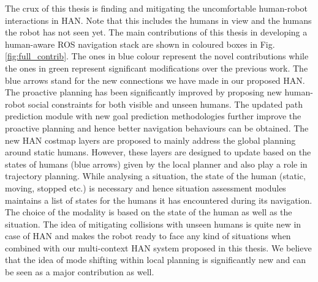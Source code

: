 The crux of this thesis is finding and mitigating the uncomfortable human-robot interactions in HAN. Note that this includes the humans in view and the humans the robot has not seen yet. The main contributions of this thesis in developing a human-aware ROS navigation stack are shown in coloured boxes in Fig. \ref{fig:full_contrib}. The ones in blue colour represent the novel contributions while the ones in green represent significant modifications over the previous work. The blue arrows stand for the new connections we have made in our proposed HAN. The proactive planning has been significantly improved by proposing new human-robot social constraints for both visible and unseen humans. The updated path prediction module with new goal prediction methodologies further improve the proactive planning and hence better navigation behaviours can be obtained. The new HAN costmap layers are proposed to mainly address the global planning around static humans. However, these layers are designed to update based on the states of humans (blue arrows) given by the local planner and also play a role in trajectory planning. While analysing a situation, the state of the human (static, moving, stopped etc.) is necessary and hence situation assessment modules maintains a list of states for the humans it has encountered during its navigation. The choice of the modality is based on the state of the human as well as the situation. The idea of mitigating collisions with unseen humans is quite new in case of HAN and makes the robot ready to face any kind of situations when combined with our multi-context HAN system proposed in this thesis. We believe that the idea of mode shifting within local planning is significantly new and can be seen as a major contribution as well.

